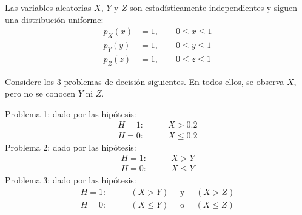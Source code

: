 
\ifspanish

\question 

Las variables aleatorias $X$, $Y$ y $Z$ son estadísticamente independientes y siguen una distribución uniforme:
\begin{align*}
p_X(x) &= 1,    \qquad 0 \le x \le 1  \\
p_Y(y) &= 1,    \qquad 0 \le y \le 1  \\
p_Z(z) &= 1,    \qquad 0 \le z \le 1
\end{align*}

Considere los 3 problemas de decisión siguientes. En todos ellos, se observa $X$, pero no se conocen $Y$ ni $Z$.

Problema 1: dado por las hipótesis:
\begin{align*}
H=1: & \qquad  X > 0.2   \\
H=0: & \qquad  X \le 0.2
\end{align*}
Problema 2: dado por las hipótesis:
\begin{align*}
H=1: & \qquad  X > Y   \\
H=0: & \qquad  X \le Y
\end{align*}
Problema 3: dado por las hipótesis:
\begin{align*}
H=1: & \qquad (X > Y)   \quad \text{ y }\quad (X > Z) \\
H=0: & \qquad (X \le Y) \quad \text{ o }\quad (X \le Z)
\end{align*}


